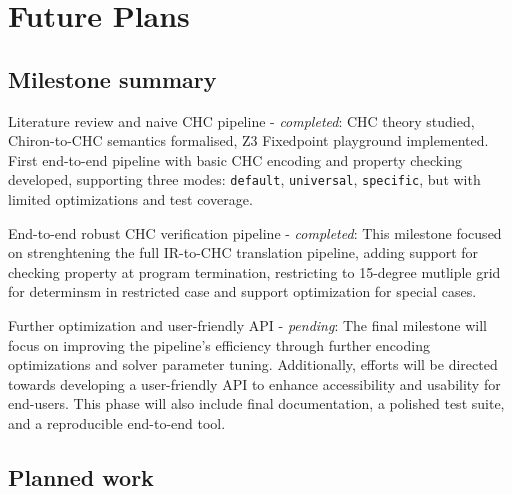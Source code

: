 \section*{Future Plans}

\subsection*{Milestone summary}

\begin{description}[leftmargin=3.2cm]
  \item[Milestone 1 \qquad] Literature review and naive CHC pipeline - \textit{completed}: CHC theory studied, Chiron-to-CHC semantics formalised, Z3 Fixedpoint playground implemented. First end-to-end pipeline with basic CHC encoding and property checking developed, supporting three modes: \texttt{default}, \texttt{universal}, \texttt{specific}, but with limited optimizations and test coverage.
  \item[Milestone 2 \qquad] End-to-end robust CHC verification pipeline - \textit{completed}: This milestone focused on strenghtening the full IR-to-CHC translation pipeline, adding support for checking property at program termination, restricting to 15-degree mutliple grid for determinsm in restricted case and support optimization for special cases.
  \item[Final Submission] Further optimization and user-friendly API - \textit{pending}: The final milestone will focus on improving the pipeline's efficiency through further encoding optimizations and solver parameter tuning. Additionally, efforts will be directed towards developing a user-friendly API to enhance accessibility and usability for end-users. This phase will also include final documentation, a polished test suite, and a reproducible end-to-end tool.
\end{description}

\subsection*{Planned work}

